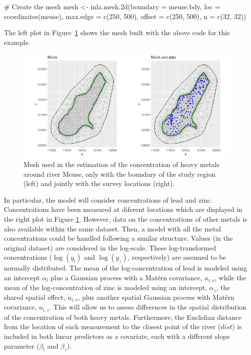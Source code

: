 \begin{example*}
# Create the mesh
mesh <- inla.mesh.2d(boundary = meuse.bdy, loc = coordinates(meuse),
  max.edge = c(250, 500), offset = c(250, 500), n = c(32, 32))
\end{example*}

\noindent
The left plot in Figure~\ref{fig:meuse:mesh} shows the mesh built with the above code for this example.



\begin{figure}[h!]
\begin{center}
\includegraphics[scale=0.5]{images/meuse_Only2_mesh.png}
\end{center}
\caption{Mesh used in the estimation of the concentration of heavy metals around river Meuse, only with the boundary of the study region (left) and jointly with the survey locations (right).}
\label{fig:meuse:mesh}
\end{figure}

In particular, the model will consider concentrations of lead and zinc. Concentrations have been measured at diferent locations which are displayed in the right plot in Figure \ref{fig:meuse:mesh}. However, data on the concentrations of other metals is also available within the same dataset. Then, a model with all the metal concentrations could be handled following a similar structure. Values (in the original dataset) are considered in the log-scale. These log-transformed concentrations ($\log(y_{l})$ and $\log(y_z)$, respectively) are assumed to be normally distributed. The mean of the log-concentration of lead is modeled using an intercept $\alpha_l$ plus a Gaussian process with a Matérn covariance, $u_{i,s}$, while the mean of the log-concentration of zinc is modeled using an intercept, $\alpha_z$, the shared spatial effect, $u_{i,s}$, plus another spatial Gaussian process with Matérn covariance, $u_{i,z}$. This will allow us to assess differences in the spatial distribution of the concentration of both heavy metals.  Furthermore, the Euclidian distance from the location of each measurement to the closest point of the river ($dist$) is included in both linear predictors as a covariate, each with a different slope parameter ($\beta_l$ and $\beta_z$). 

